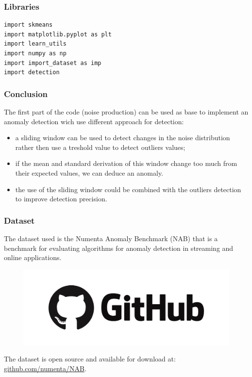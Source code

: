 \documentclass[xcolor ={table,usenames,dvipsnames}]{beamer}
\theoremstyle{definition}
\begin{document}
	\begin{frame}[fragile]
		\frametitle{Libraries}
		
		\begin{lstlisting}
import skmeans
import matplotlib.pyplot as plt
import learn_utils
import numpy as np
import import_dataset as imp
import detection
		\end{lstlisting}
	\end{frame}

	\begin{frame}
		\frametitle{Conclusion}
		The first part of the code (noise production) can be used as base to implement an anomaly detection wich use different approach for detection:
		\begin{itemize}
			\item a sliding window can be used to detect changes in the noise distribution rather then use a treshold value to detect outliers values;
			\item if the mean and standard derivation of this window change too much from their expected values, we can deduce an anomaly.
			\item the use of the sliding window could be combined with the outliers detection to improve detection precision.
		\end{itemize}
	\end{frame}

	\begin{frame}[fragile]
		\frametitle{Dataset}
		The dataset used is the Numenta Anomaly Benchmark (NAB) that is a benchmark for evaluating algorithms for anomaly detection in streaming and online applications.
		
		\begin{figure}[h!]
			\centering
			\includegraphics[scale=0.08]{img/github.png}
		\end{figure}
	
		The dataset is open source and available for download at:\\
		\href{github.com/numenta/NAB}{github.com/numenta/NAB}.
	\end{frame}
	
\end{document}
